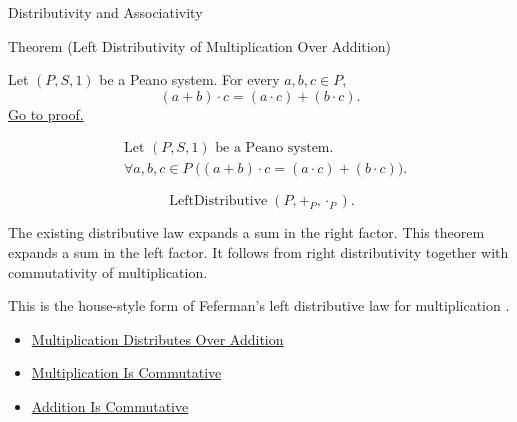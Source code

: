 \begin{topicbox}{Distributivity and Associativity}
\begin{theorembox}{Theorem (Left Distributivity of Multiplication Over Addition)}
\begin{theorem}
\label{thm:left-distributivity-of-multiplication-over-addition}
Let $(P,S,1)$ be a Peano system. For every $a,b,c \in P$,
\[
(a+b)\cdot c=(a\cdot c)+(b\cdot c).
\]
\hyperref[prf:left-distributivity-of-multiplication-over-addition]{Go to proof.}
\end{theorem}
\end{theorembox}

\begin{remark*}
\[
\begin{aligned}
&\text{Let } (P,S,1) \text{ be a Peano system.}\\
&\forall a,b,c \in P\;\bigl((a+b)\cdot c=(a\cdot c)+(b\cdot c)\bigr).
\end{aligned}
\]
\end{remark*}

\begin{remark*}
\[
\operatorname{LeftDistributive}(P,+_P,\cdot_P).
\]
\end{remark*}

\begin{remark*}[Interpretation]
The existing distributive law expands a sum in the right factor. This theorem
expands a sum in the left factor. It follows from right distributivity together
with commutativity of multiplication.


This is the house-style form of Feferman's left distributive law for
multiplication \citep{FefermanNumberSystems1964}.
\end{remark*}

\begin{dependencies}
\begin{itemize}
  \item \hyperref[thm:multiplication-distributes-over-addition]{Multiplication Distributes Over Addition}
  \item \hyperref[thm:multiplication-commutative]{Multiplication Is Commutative}
  \item \hyperref[thm:addition-commutative]{Addition Is Commutative}
\end{itemize}
\end{dependencies}


\end{topicbox}
